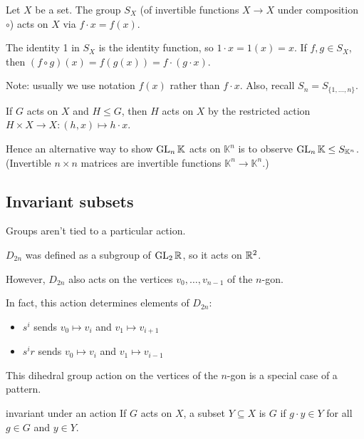 \documentclass[12pt,letterpaper]{report}
\begin{document}
\begin{prop}{}{}
  Let $X$ be a set.
  The group $S_X$ (of invertible functions $X \to X$ under composition $\circ$) acts on $X$
  via $f \cdot x = f(x)$.
\end{prop}

\begin{thmproof}
  The identity 1 in $S_X$ is the identity function, so $1 \cdot x = 1(x) = x$.
  If $f, g \in S_X$, then $(f \circ g)(x) = f(g(x)) = f \cdot (g \cdot x)$.
\end{thmproof}

Note: usually we use notation $f(x)$ rather than $f \cdot x$.
Also, recall $S_n = S_{\{1, \ldots, n\}}$.

\begin{lem}{}{}
  If $G$ acts on $X$ and $H \leq G$, then $H$ acts on $X$ by the restricted action
  $H \times X \to X : (h, x) \mapsto h \cdot x$.
\end{lem}

Hence an alternative way to show $\operatorname{GL}_n\mathbb{K}$ acts on $\mathbb{K}^n$ is to observe
$\operatorname{GL}_n\mathbb{K} \leq S_{\mathbb{K}^n}$.
(Invertible $n \times n$ matrices are invertible functions $\mathbb{K}^n \to \mathbb{K}^n$.)

\pagebreak
\subsection{Invariant subsets}

Groups aren't tied to a particular action.

\begin{ex}
  $D_{2n}$ was defined as a subgroup of $\operatorname{GL}_2\mathbb{R}$, so it acts on $\mathbb{R}^2$.

  However, $D_{2n}$ also acts on the vertices $v_0, \ldots, v_{n - 1}$ of the $n$-gon.

  In fact, this action determines elements of $D_{2n}$:
  \begin{itemize}
    \item $s^i$ sends $v_0 \mapsto v_i$ and $v_1 \mapsto v_{i + 1}$
    \item $s^i r$ sends $v_0 \mapsto v_i$ and $v_1 \mapsto v_{i - 1}$
  \end{itemize}
\end{ex}

This dihedral group action on the vertices of the $n$-gon is a special case of a pattern.

\begin{defn}{invariant under an action}{}
  If $G$ acts on $X$, a subset $Y \subseteq X$ is  $G$ if
  $g \cdot y \in Y$ for all $g \in G$ and $y \in Y$.
\end{defn}
\end{document}
